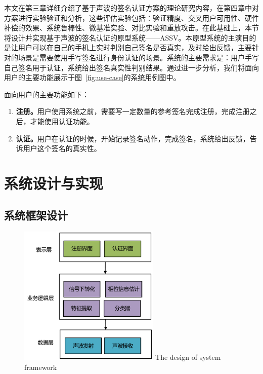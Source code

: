 本文在第三章详细介绍了基于声波的签名认证方案的理论研究内容，在第四章中对方案进行实验验证和分析，这些评估实验包括：验证精度、交叉用户可用性、硬件补偿的效果、系统鲁棒性、微基准实验、对比实验和重放攻击。在此基础上，本节将设计并实现基于声波的签名认证的原型系统——ASSV。本原型系统的主演目的是让用户可以在自己的手机上实时判别自己签名是否真实，及时给出反馈，主要针对的场景是需要使用手写签名进行身份认证的场景。系统的主要需求是：用户手写自己签名用于认证，系统给出签名真实性判别结果。通过进一步分析，我们将面向用户的主要功能展示于图~\ref{fig:use-case}的系统用例图中。

面向用户的主要功能如下：
\begin{enumerate}[label=(\arabic*)]
    \item \textbf{注册。}用户使用系统之前，需要写一定数量的参考签名完成注册，完成注册之后，才能使用认证功能。
    \item \textbf{认证。}用户在认证的时候，开始记录签名动作，完成签名，系统给出反馈，告诉用户这个签名的真实性。
\end{enumerate}


\section{系统设计与实现}
\subsection{系统框架设计}

\begin{figure}
  \centering
  \includegraphics[width=0.6\textwidth]{figure/prototype-architecture.pdf}
      {The design of system framework}
  \label{fig:system-framework}
\end{figure}

